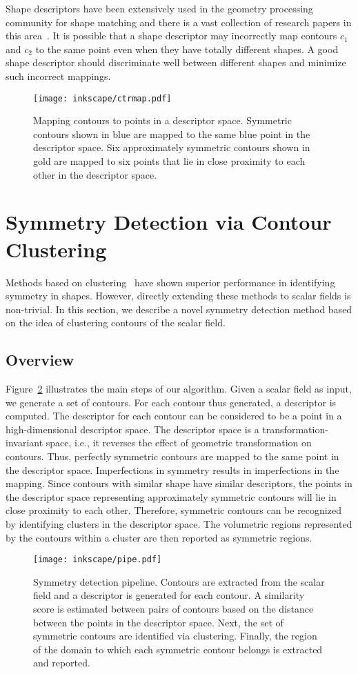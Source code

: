 \documentclass[review,journal]{vgtc}         %
\begin{document}
Shape descriptors have been extensively used in the
geometry processing community for shape matching and there is a
vast collection of research papers in this 
area~\cite{lian2013,van2011,tangelder2008survey,qin2008content}. 
It is possible that a shape descriptor may incorrectly map contours $c_1$ and 
$c_2$ to the same point even when they have totally different shapes. A good shape descriptor should 
discriminate well between different shapes and minimize such incorrect
mappings. 
\begin{figure}[b]
\centering
{
	\texttt{[image: inkscape/ctrmap.pdf]}
	\caption{\label{ctmap}Mapping contours to points in a descriptor space. Symmetric contours
		shown in blue are mapped to the same blue point in the descriptor space. Six approximately
		symmetric contours shown in gold are mapped to six points that lie in close
		proximity to each other in the descriptor space.}
}
\end{figure}
\section{Symmetry Detection via Contour Clustering}
Methods based on clustering~\cite{Mitra06,Lip10,MitraGP07,Xu12,RavBBK10,Xu09}
have shown superior performance in identifying
symmetry in shapes. However, directly extending these methods to scalar fields
is non-trivial. In this section, we describe a novel symmetry detection method
based on the idea of clustering contours of the scalar field.
\subsection{Overview}
Figure~\ref{pipeline} illustrates the main steps of our algorithm.
Given a scalar field as input, we generate a set of contours. For each contour
thus generated, a descriptor is computed. The descriptor for each contour
can be considered to be a point in a high-dimensional 
descriptor space. The descriptor space is a transformation-invariant space,
i.e., it reverses the effect of geometric transformation on contours. Thus, perfectly
symmetric contours are mapped to the same point in the descriptor space.
Imperfections in symmetry results in imperfections in the mapping.
Since contours with similar shape have similar descriptors,
the points in the descriptor space representing approximately symmetric 
contours will lie in close proximity to each other. Therefore, symmetric contours
can be recognized by identifying clusters in the descriptor space. The volumetric
regions represented by the contours within a cluster are then reported as
symmetric regions.
\begin{figure*}[t]
	\centering
		\texttt{[image: inkscape/pipe.pdf]}
	\caption{\label{pipeline} Symmetry detection pipeline. Contours are extracted
		from the scalar field and a descriptor is generated for each contour.
		A similarity score is estimated between pairs of contours based on the
		distance between the points in the descriptor space. Next, the set of symmetric
		contours are identified via clustering. Finally, the region of the domain to
		which each symmetric contour belongs is extracted and reported.}
\end{figure*}
\end{document}
